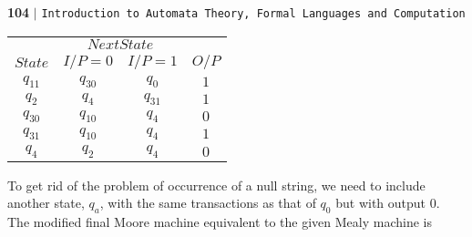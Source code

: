 \documentclass{article}
\begin{document}
\newpage

\begin{flushleft}
    \textbf{104}\hspace*{0.1cm} \textbf{$|$} \hspace*{0.1cm} \texttt{Introduction to Automata Theory, Formal Languages and Computation}
  \end{flushleft}
  \vspace*{1cm}

  \begin{center}
\begin{tabular}{cccc}
 \hline

 \hline

 \hline

 \hline
 & \multicolumn{2}{c}{$Next State$ }\\
 \cline{2-3}
 $State$ &  $I/P=0$ & $I/P=1$  &  $O/P$\\
\hline
$q_11$   &    $q_30$   &  $q_0$    &  $1$ \\
$q_2$    &    $q_4$    &  $q_31$   &  $1$ \\
$q_30$   &    $q_10$   &  $q_4$    &  $0$ \\
$q_31$   &    $q_10$   &  $q_4$    &  $1$ \\
$q_4$    &    $q_2$    &  $q_4$    &  $0$ \\
 \hline

 \hline

 \hline

 \hline
\end{tabular}
\end{center}

\vspace*{0.3cm}
To get rid of the problem of occurrence of a null string, we need to include another state, $q_a$, with
the same transactions as that of $q_0$ but with output 0.\\

\hspace*{0.5cm} The modified final Moore machine equivalent to the given Mealy machine is\\
\end{document}
